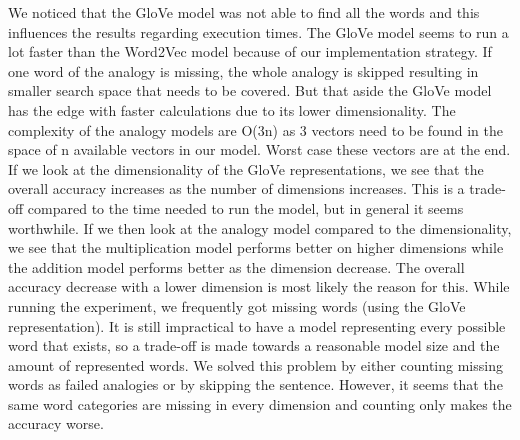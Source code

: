 We noticed that the GloVe model was not able to find all the words and this influences the results regarding execution times. The GloVe model seems to run a lot faster than the Word2Vec model because of our implementation strategy. If one word of the analogy is missing, the whole analogy is skipped resulting in smaller search space that needs to be covered. But that aside the GloVe model has the edge with faster calculations due to its lower dimensionality.
\newline
\newline
The complexity of the analogy models are O(3n) as 3 vectors need to be found in the space of n available vectors in our model. Worst case these vectors are at the end.
\newline
\newline
If we look at the dimensionality of the GloVe representations, we see that the overall accuracy increases as the number of dimensions increases. This is a trade-off compared to the time needed to run the model, but in general it seems worthwhile. 
If we then look at the analogy model compared to the dimensionality, we see that the multiplication model performs better on higher dimensions while the addition model performs better as the dimension decrease. The overall accuracy decrease with a lower dimension is most likely the reason for this.
\newline
\newline
While running the experiment, we frequently got missing words (using the GloVe representation). It is still impractical to have a model representing every possible word that exists, so a trade-off is made towards a reasonable model size and the amount of represented words. We solved this problem by either counting missing words as failed analogies or by skipping the sentence. However, it seems that the same word categories are missing in every dimension and counting only makes the accuracy worse.


